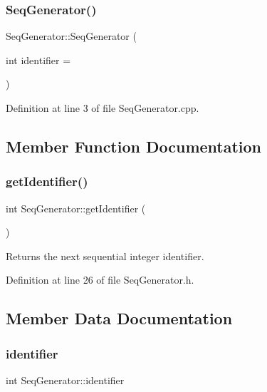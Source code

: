 \subsubsection{\texorpdfstring{Seq\+Generator()}{SeqGenerator()}}
{\footnotesize\ttfamily Seq\+Generator\+::\+Seq\+Generator (\begin{DoxyParamCaption}\item[{int}]{identifier = {} }\end{DoxyParamCaption})}



Definition at line 3 of file Seq\+Generator.\+cpp.



\subsection{Member Function Documentation}
\mbox{\label{class_seq_generator_aff652f8e839fef2162cc47222a99d5db}} 
\subsubsection{\texorpdfstring{get\+Identifier()}{getIdentifier()}}
{\footnotesize\ttfamily int Seq\+Generator\+::get\+Identifier (\begin{DoxyParamCaption}{ }\end{DoxyParamCaption})\hspace{0.3cm}{\ttfamily [inline]}}

Returns the next sequential integer identifier. 

Definition at line 26 of file Seq\+Generator.\+h.



\subsection{Member Data Documentation}
\mbox{\label{class_seq_generator_ab2da7d7c7ee5a92305ca026c180c2037}} 
\subsubsection{\texorpdfstring{identifier}{identifier}}
{\footnotesize\ttfamily int Seq\+Generator\+::identifier\hspace{0.3cm}{\ttfamily [protected]}}

